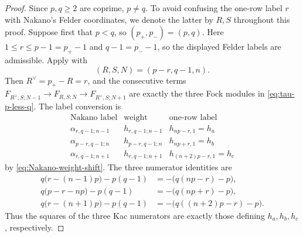 \documentclass[12pt,leqno]{amsart}
\numberwithin{equation}{section}
\begin{document}
\begin{proof}
Since $p,q\ge2$ are coprime, $p\neq q$.  To avoid confusing the one-row
label $r$ with Nakano's Felder coordinates, we denote the latter by
$R,S$ throughout this proof.  Suppose first that $p<q$, so
$(p_+,p_-)=(p,q)$.  Here $1\le r\le p-1=p_+-1$ and $q-1=p_--1$, so the displayed Felder
labels are admissible.  Apply \cite[Proposition~2.7(1)]{Nakano} with
\[
 (R,S,N)=(p-r,q-1,n).
\]
Then $R^\vee=p_+-R=r$, and the consecutive terms
$F_{R^\vee,S;N-1}\to F_{R,S;N}\to F_{R^\vee,S;N+1}$ are exactly the
three Fock modules in \eqref{eq:tau-p-less-q}.  The label conversion is
\[
\begin{array}{c|c|c}
 \text{Nakano label}&\text{weight}&\text{one-row label}\\ \hline
 \alpha_{r,q-1;n-1}&h_{r,q-1;n-1}&h_{np-r,1}=h_a\\
 \alpha_{p-r,q-1;n}&h_{p-r,q-1;n}&h_{np+r,1}=h_b\\
 \alpha_{r,q-1;n+1}&h_{r,q-1;n+1}&h_{(n+2)p-r,1}=h_c
\end{array}
\]
by \eqref{eq:Nakano-weight-shift}.  The three numerator identities are
\[
\begin{aligned}
 q\bigl(r-(n-1)p\bigr)-p(q-1)
   &=-\bigl(q(np-r)-p\bigr),\\
 q\bigl(p-r-np\bigr)-p(q-1)
   &=-\bigl(q(np+r)-p\bigr),\\
 q\bigl(r-(n+1)p\bigr)-p(q-1)
   &=-\bigl(q((n+2)p-r)-p\bigr).
\end{aligned}
\]
Thus the squares of the three Kac numerators are exactly those defining
$h_a,h_b,h_c$, respectively.


\end{proof}
\end{document}
